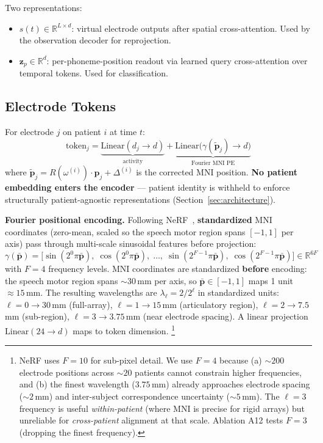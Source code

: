 \documentclass[11pt,letterpaper]{article}
\newcommand{\bfp}{\mathbf{p}}
\newcommand{\bfz}{\mathbf{z}}
\newcommand{\R}{\mathbb{R}}
\begin{document}
Two representations:
\begin{itemize}[leftmargin=2em]
\item $s(t) \in \R^{L \times d}$: virtual electrode outputs after spatial cross-attention. Used by the observation decoder for reprojection.
\item $\bfz_p \in \R^d$: per-phoneme-position readout via learned query cross-attention over temporal tokens. Used for classification.
\end{itemize}


\subsection{Electrode Tokens}\label{sec:tokens}

For electrode $j$ on patient $i$ at time $t$:
\begin{equation}
\text{token}_j = \underbrace{\text{Linear}(d_j \to d)}_{\text{activity}} + \underbrace{\text{Linear}\bigl(\gamma(\tilde{\bfp}_j) \to d\bigr)}_{\text{Fourier MNI PE}}
\end{equation}
where $\tilde{\bfp}_j = R(\omega^{(i)}) \cdot \bfp_j + \Delta^{(i)}$ is the corrected MNI position. \textbf{No patient embedding enters the encoder} --- patient identity is withheld to enforce structurally patient-agnostic representations (Section~\ref{sec:architecture}).

\textbf{Fourier positional encoding.} Following NeRF~\cite{mildenhall2020}, \textbf{standardized} MNI coordinates (zero-mean, scaled so the speech motor region spans $[{-}1, 1]$ per axis) pass through multi-scale sinusoidal features before projection:
\begin{equation}
\gamma(\bar{\bfp}) = \bigl[\sin(2^0 \pi \bar{\bfp}),\; \cos(2^0 \pi \bar{\bfp}),\; \ldots,\; \sin(2^{F-1} \pi \bar{\bfp}),\; \cos(2^{F-1} \pi \bar{\bfp})\bigr] \in \R^{6F}
\end{equation}
with $F{=}4$ frequency levels. MNI coordinates are standardized \textbf{before} encoding: the speech motor region spans ${\sim}30$\,mm per axis, so $\bar{\bfp} \in [{-}1, 1]$ maps 1 unit $\approx 15$\,mm. The resulting wavelengths are $\lambda_\ell = 2/2^\ell$ in standardized units: $\ell{=}0 \to 30$\,mm (full-array), $\ell{=}1 \to 15$\,mm (articulatory region), $\ell{=}2 \to 7.5$\,mm (sub-region), $\ell{=}3 \to 3.75$\,mm (near electrode spacing). A linear projection $\text{Linear}(24 \to d)$ maps to token dimension.%
\footnote{NeRF uses $F{=}10$ for sub-pixel detail. We use $F{=}4$ because (a) ${\sim}200$ electrode positions across ${\sim}20$ patients cannot constrain higher frequencies, and (b) the finest wavelength ($3.75$\,mm) already approaches electrode spacing (${\sim}2$\,mm) and inter-subject correspondence uncertainty (${\sim}5$\,mm). The $\ell{=}3$ frequency is useful \textit{within-patient} (where MNI is precise for rigid arrays) but unreliable for \textit{cross-patient} alignment at that scale. Ablation A12 tests $F{=}3$ (dropping the finest frequency).}
\end{document}
